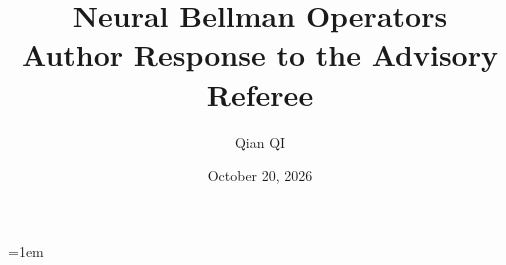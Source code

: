 \documentclass[11pt]{article}
\title{Neural Bellman Operators\\Author Response to the Advisory Referee}
\author{Qian QI}
\date{October 20, 2026}
\begin{document}
\emergencystretch=1em
\maketitle

\end{document}
